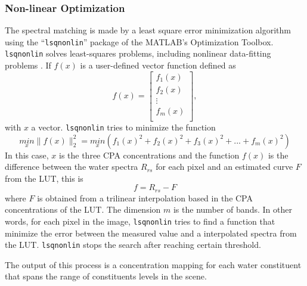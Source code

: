 \subsubsection{Non-linear Optimization}
The spectral matching is made by a least square error minimization algorithm using the ``\texttt{lsqnonlin}'' package of the MATLAB's Optimization Toolbox. \texttt{lsqnonlin} solves least-squares problems, including nonlinear data-fitting problems . If $f(x)$ is a user-defined vector function defined as
\begin{equation}
  f(x)=
  \left[
    \begin{array}{c}
      f_1(x) \\
      f_2(x) \\
      \vdots \\
      f_m(x) \\
    \end{array}
  \right],
\end{equation}
with $x$ a vector. \texttt{lsqnonlin} tries to minimize the function
\begin{equation}
  \underset{x}{min}\parallel f(x) \parallel^2_2=\underset{x}{min}(f_1(x)^2+f_2(x)^2+f_3(x)^2+...+f_m(x)^2)
\end{equation}
In this case, $x$ is the three CPA concentrations and the function $f(x)$ is the difference between the water spectra $R_{rs}$ for each pixel and an estimated curve $F$ from the LUT, this is
\begin{equation}
  f = R_{rs} - F
\end{equation}
where $F$ is obtained from a trilinear interpolation based in the CPA concentrations of the LUT. The dimension $m$ is the number of bands. In other words, for each pixel in the image, \texttt{lsqnonlin} tries to find a function that minimize the error between the measured value and a interpolated spectra from the LUT. \texttt{lsqnonlin} stops the search after reaching certain threshold. 

The output of this process is a concentration mapping for each water constituent that spans the range of constituents levels in the scene. 


